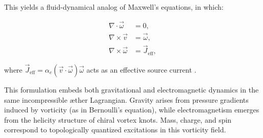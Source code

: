 This yields a fluid-dynamical analog of Maxwell's equations, in which:

\begin{align}
\nabla \cdot \vec{\omega} &= 0, \label{eq:divB} \\
\nabla \times \vec{v} &= \vec{\omega}, \label{eq:curlE} \\
\nabla \times \vec{\omega} &= \vec{J}_\text{eff}, \label{eq:ampere}
\end{align}

where $\vec{J}_\text{eff} = \alpha_e (\vec{v} \cdot \vec{\omega}) \vec{\omega}$ acts as an effective source current \cite{yakovenko2021fluid,finn2020helicity}.

\vspace{1em}
\noindent
This formulation embeds both gravitational and electromagnetic dynamics in the same incompressible æther Lagrangian. Gravity arises from pressure gradients induced by vorticity (as in Bernoulli's equation), while electromagnetism emerges from the helicity structure of chiral vortex knots. Mass, charge, and spin correspond to topologically quantized excitations in this vorticity field.



